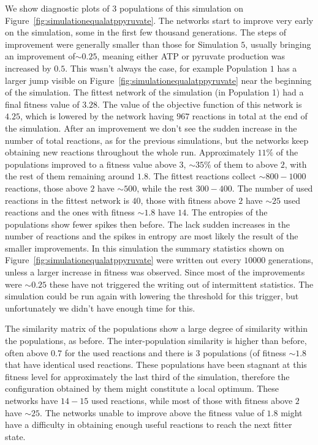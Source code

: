 \documentclass[a4paper,12pt]{article}
\begin{document}
We show diagnostic plots of $3$ populations of this simulation on Figure~\ref{fig:simulationequalatppyruvate}. The networks start to improve very early on the simulation, some in the first few thousand generations. The steps of improvement were generally smaller than those for Simulation $5$, usually bringing an improvement of$\sim 0.25$, meaning either ATP or pyruvate production was increased by $0.5$. This wasn't always the case, for example Population $1$ has a larger jump visible on Figure~\ref{fig:simulationequalatppyruvate} near the beginning of the simulation. The fittest network of the simulation (in Population 1) had a final fitness value of $3.28$. The value of the objective function of this network is $4.25$, which is lowered by the network having $967$ reactions in total at the end of the simulation. After an improvement we don't see the sudden increase in the number of total reactions, as for the previous simulations, but the networks keep obtaining new reactions throughout the whole run. Approximately $11\%$ of the populations improved to a fitness value above $3$, $\sim 35\%$ of them to above $2$, with the rest of them remaining around $1.8$. The fittest reactions collect $\sim 800-1000$ reactions, those above $2$ have $\sim 500$, while the rest $300-400$. The number of used reactions in the fittest network is $40$, those with fitness above $2$ have $\sim 25$ used reactions and the ones with fitness $\sim1.8$ have $14$. The entropies of the populations show fewer spikes then before. The lack sudden increases in the number of reactions and the spikes in entropy are most likely the result of the smaller improvements. In this simulation the summary statistics shown on Figure~\ref{fig:simulationequalatppyruvate} were written out every $10000$ generations, unless a larger increase in fitness was observed. Since most of the improvements were $\sim 0.25$ these have not triggered the writing out of intermittent statistics. The simulation could be run again with lowering the threshold for this trigger, but unfortunately we didn't have enough time for this. 

The similarity matrix of the populations show a large degree of similarity within the populations, as before. The inter-population similarity is higher than before, often above $0.7$ for the used reactions and there is $3$ populations (of fitness $\sim 1.8$ that have identical used reactions. These populations have been stagnant at this fitness level for approximately the last third of the simulation, therefore the configuration obtained by them might constitute a local optimum. These networks have $14-15$ used reactions, while most of those with fitness above $2$ have $\sim 25$. The networks unable to improve above the fitness value of $1.8$ might have a difficulty in obtaining enough useful reactions to reach the next fitter state. 
\end{document}

